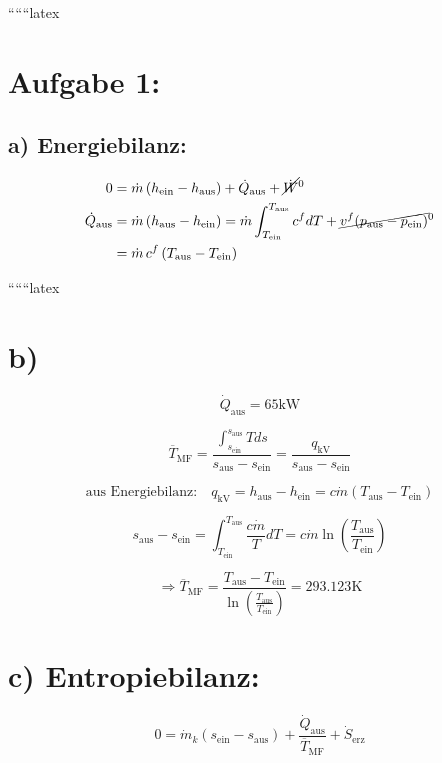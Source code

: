 
``````latex

\section*{Aufgabe 1:}

\subsection*{a) Energiebilanz:}

\begin{align*}
0 &= \dot{m} \left( h_{\text{ein}} - h_{\text{aus}} \right) + \dot{Q}_{\text{aus}} + \cancel{\dot{W}}^0 \\
\dot{Q}_{\text{aus}} &= \dot{m} \left( h_{\text{aus}} - h_{\text{ein}} \right) = \dot{m} \int_{T_{\text{ein}}}^{T_{\text{aus}}} c^f dT + \cancel{v^f (p_{\text{aus}} - p_{\text{ein}})}^0 \\
&= \dot{m} \, c^f \left( T_{\text{aus}} - T_{\text{ein}} \right)
\end{align*}

``````latex

\section*{b)}

\[
\dot{Q}_{\text{aus}} = 65 \text{kW}
\]

\[
\overline{T}_{\text{MF}} = \frac{\int_{s_{\text{ein}}}^{s_{\text{aus}}} T ds}{s_{\text{aus}} - s_{\text{ein}}} = \frac{q_{\text{kV}}}{s_{\text{aus}} - s_{\text{ein}}}
\]

\[
\text{aus Energiebilanz:} \quad q_{\text{kV}} = h_{\text{aus}} - h_{\text{ein}} = c \dot{m} (T_{\text{aus}} - T_{\text{ein}})
\]

\[
s_{\text{aus}} - s_{\text{ein}} = \int_{T_{\text{ein}}}^{T_{\text{aus}}} \frac{c \dot{m}}{T} dT = c \dot{m} \ln \left( \frac{T_{\text{aus}}}{T_{\text{ein}}} \right)
\]

\[
\Rightarrow \overline{T}_{\text{MF}} = \frac{T_{\text{aus}} - T_{\text{ein}}}{\ln \left( \frac{T_{\text{aus}}}{T_{\text{ein}}} \right)} = 293.123 \text{K}
\]

\section*{c) Entropiebilanz:}

\[
0 = \dot{m}_k \left( s_{\text{ein}} - s_{\text{aus}} \right) + \frac{\dot{Q}_{\text{aus}}}{\overline{T}_{\text{MF}}} + \dot{S}_{\text{erz}}
\]


